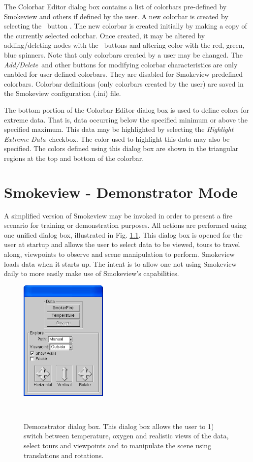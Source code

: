 \documentclass[11pt,twoside]{book}
\newcommand{\frameit}[1]{\fbox{\tt #1}}
\begin{document}
The Colorbar Editor dialog box contains a list of colorbars
pre-defined by Smokeview and others if defined by the user. A new
colorbar is created by selecting the \frameit{New}\ button . The
new colorbar is created initially by making a copy of the
currently selected colorbar. Once created, it may be altered by
adding/deleting nodes with the \frameit{Add/Delete}\ buttons and
altering color with the red, green, blue spinners. Note that only
colorbars created by a user may be changed. The {\em Add/Delete}\
and other buttons for modifying colorbar characteristics are only
enabled for user defined colorbars.  They are disabled for
Smokeview predefined colorbars. Colorbar definitions (only
colorbars created by the user) are saved in the Smokeview
configuration (.ini) file.

The bottom portion of the Colorbar Editor dialog box is
used to define colors for extreme data.  That is, data occurring
below the specified minimum or above the specified maximum.  This
data may be highlighted by selecting the {\em Highlight Extreme
Data}\ checkbox. The color used to highlight this data may also be
specified.  The colors defined using this dialog box are shown in
the triangular regions at the top and bottom of the colorbar.

\chapter{Smokeview - Demonstrator Mode}
A simplified version of Smokeview may be invoked in order to present a fire
scenario for training or demonstration
purposes.  All actions are performed using one unified dialog box,
illustrated in Fig. \ref{figDEMO}.  This dialog box is opened for the
user at startup and allows the user to select data to be viewed, tours to
travel along, viewpoints to observe and scene manipulation to perform.
Smokeview loads data when it starts up.
The intent is to allow one not using Smokeview daily to more easily
make use of Smokeview's capabilities.


\begin{figure}[bph]
\begin{center}
\includegraphics[width=1.67777in]{FIGURES/figDEMO}
\end{center}
\caption[Demonstrator dialog box.]{Demonstrator dialog box.
This dialog box allows the user to 1) switch between temperature,
oxygen and realistic views of the data,
select tours and viewpoints
 and to manipulate the scene using translations and rotations.}\ \label{figDEMO}
\end{figure}
\end{document}
